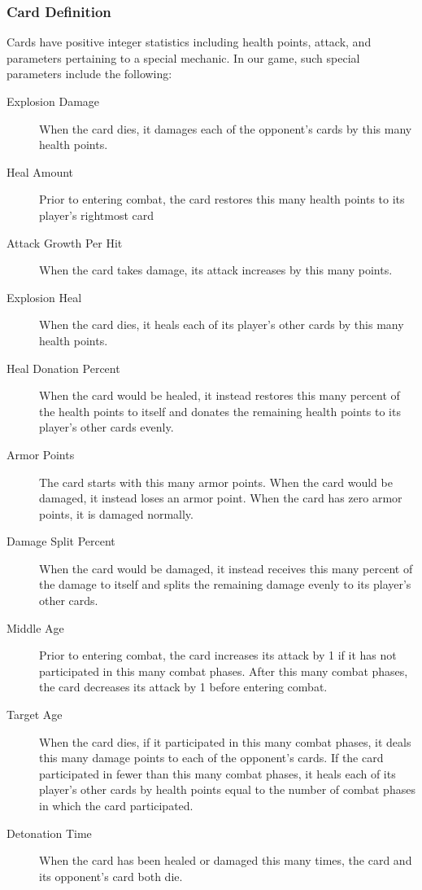 \subsubsection{Card Definition} \label{sec:ab-game-def}

Cards have positive integer statistics including health points, 
attack, and parameters pertaining to a special mechanic. In our game, such special parameters
include the following:

\begin{description}
	\item[Explosion Damage] When the card dies, it damages
	each of the opponent's cards by this many health points.
	\item[Heal Amount] Prior to entering combat, the card 
	restores this many health points to its player's rightmost
	card
	\item[Attack Growth Per Hit] When the card takes damage, its
	attack increases by this many points.
	\item[Explosion Heal] When the card dies, it heals
	each of its player's other cards by this many health points.
	\item[Heal Donation Percent] When the card would be healed,
	it instead restores this many percent of the health points
	to itself and donates the remaining health points to its
	player's other cards evenly.
	\item[Armor Points] The card starts with this many armor points.
	When the card would be damaged, it instead loses an armor point.
	When the card has zero armor points, it is damaged normally.
	\item[Damage Split Percent] When the card would be damaged,
	it instead receives this many percent of the damage to itself
	and splits the remaining damage evenly to its player's other cards.
	\item[Middle Age] Prior to entering combat, the card increases its
	attack by 1 if it has not participated in this many combat phases.
	After this many combat phases, the card decreases its attack by 1
	before entering combat.
	\item[Target Age] When the card dies, if it participated in this many
	combat phases, it deals this many damage points to each of the opponent's
	cards. If the card participated in fewer than this many combat phases, 
	it heals each of its player's other cards by health points equal to the
	number of combat phases in which the card participated.
	\item[Detonation Time] When the card has been healed or damaged this
	many times, the card and its opponent's card both die.
\end{description}

